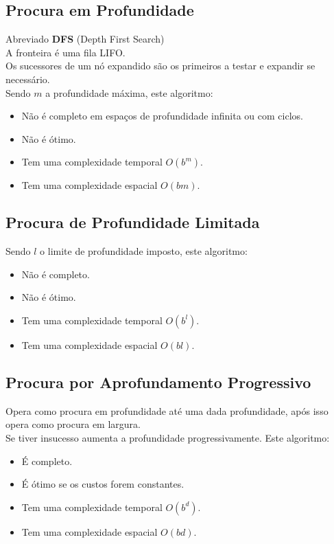 \documentclass[]{report}
\begin{document}
\subsection{Procura em Profundidade}
Abreviado \textbf{DFS} (Depth First Search)\\
A fronteira é uma fila LIFO.\\
Os sucessores de um nó expandido são os primeiros a testar e expandir se necessário.\\
Sendo $m$ a profundidade máxima, este algoritmo:
\begin{itemize}
	\item Não é completo em espaços de profundidade infinita ou com ciclos.
	\item Não é ótimo.
	\item Tem uma complexidade temporal $O(b^m)$.
	\item Tem uma complexidade espacial $O(bm)$.\\
\end{itemize}
\subsection{Procura de Profundidade Limitada}
Sendo $l$ o limite de profundidade imposto, este algoritmo:
\begin{itemize}
	\item Não é completo.
	\item Não é ótimo.
	\item Tem uma complexidade temporal $O(b^l)$.
	\item Tem uma complexidade espacial $O(bl)$.\\
\end{itemize}
\subsection{Procura por Aprofundamento Progressivo}
Opera como procura em profundidade até uma dada profundidade, após isso opera como procura em largura.\\
Se tiver insucesso aumenta a profundidade progressivamente.
Este algoritmo:
\begin{itemize}
	\item É completo.
	\item É ótimo se os custos forem constantes.
	\item Tem uma complexidade temporal $O(b^d)$.
	\item Tem uma complexidade espacial $O(bd)$.\\
\end{itemize}
\end{document}
